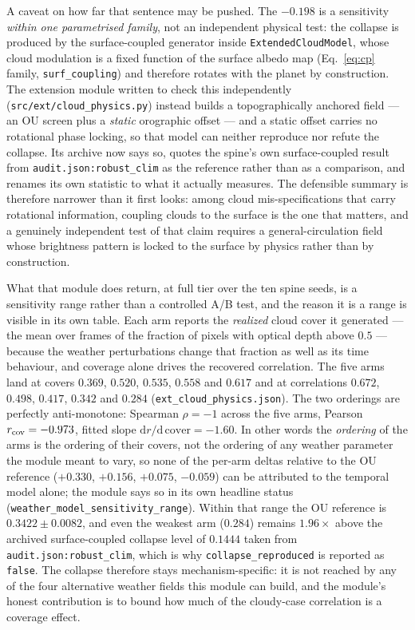 \documentclass[twocolumn,10pt]{article}
\begin{document}
A caveat on how far that sentence may be pushed. The $-0.198$ is a sensitivity
\emph{within one parametrised family}, not an independent physical test: the
collapse is produced by the surface-coupled generator inside
{\tt ExtendedCloudModel}, whose cloud modulation is a fixed function of the
surface albedo map (Eq.~\ref{eq:cp} family, {\tt surf\_coupling}) and therefore
rotates with the planet by construction. The extension module written to check
this independently ({\tt src/ext/cloud\_physics.py}) instead builds a
topographically anchored field --- an OU screen plus a \emph{static} orographic
offset --- and a static offset carries no rotational phase locking, so that model
can neither reproduce nor refute the collapse. Its archive now says so, quotes the
spine's own surface-coupled result from {\tt audit.json:robust\_clim} as the
reference rather than as a comparison, and renames its own statistic to what it
actually measures. The defensible summary is therefore narrower than it first
looks: among cloud mis-specifications that carry rotational information, coupling
clouds to the surface is the one that matters, and a genuinely independent test of
that claim requires a general-circulation field whose brightness pattern is locked
to the surface by physics rather than by construction.

What that module does return, at full tier over the ten spine seeds, is a
sensitivity range rather than a controlled A/B test, and the reason it is a range
is visible in its own table. Each arm reports the \emph{realized} cloud cover it
generated --- the mean over frames of the fraction of pixels with optical depth
above $0.5$ --- because the weather perturbations change that fraction as well as
its time behaviour, and coverage alone drives the recovered correlation. The five
arms land at covers $0.369$, $0.520$, $0.535$, $0.558$ and $0.617$ and at
correlations $0.672$, $0.498$, $0.417$, $0.342$ and $0.284$
({\tt ext\_cloud\_physics.json}). The two orderings are perfectly anti-monotone:
Spearman $\rho=-1$ across the five arms, Pearson $r_{\rm cov}=-0.973$, fitted
slope $\mathrm{d}r/\mathrm{d}\,\text{cover}=-1.60$. In other words the
\emph{ordering} of the arms is the ordering of their covers, not the ordering of
any weather parameter the module meant to vary, so none of the per-arm deltas
relative to the OU reference ($+0.330$, $+0.156$, $+0.075$, $-0.059$) can be
attributed to the temporal model alone; the module says so in its own headline
status ({\tt weather\_model\_sensitivity\_range}). Within that range the OU
reference is $0.3422\pm0.0082$, and even the weakest arm ($0.284$) remains
$1.96\times$ above the archived surface-coupled collapse level of $0.1444$ taken
from {\tt audit.json:robust\_clim}, which is why {\tt collapse\_reproduced} is
reported as {\tt false}. The collapse therefore stays mechanism-specific: it is
not reached by any of the four alternative weather fields this module can build,
and the module's honest contribution is to bound how much of the cloudy-case
correlation is a coverage effect.
\end{document}
